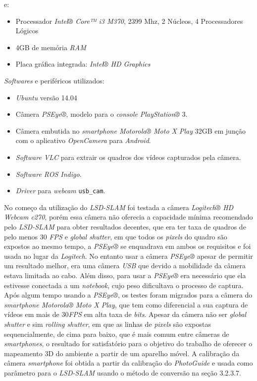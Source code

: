 e:

\begin{itemize}
	\item{Processador \textit{Intel® Core™ i3 M370}, 2399 Mhz, 2 Núcleos, 4 Processadores Lógicos}
	\item{4GB de memória \textit{RAM}}
	\item{Placa gráfica integrada: \textit{Intel® HD Graphics}}
\end{itemize}	

\textit{Softwares} e periféricos utilizados:

\begin{itemize}
	\item{\textit{Ubuntu} versão 14.04\cite{Ubuntu}}
	\item{Câmera \textit{PSEye®}, modelo para o \textit{console} \textit{PlayStation®} 3.}
	\item{Câmera embutida no \textit{smartphone Motorola® Moto X Play} 32GB em junção com o aplicativo \textit{OpenCamera} para \textit{Android}.}
	\item{\textit{Software VLC} para extrair os quadros dos vídeos capturados pela câmera.}
	\item{\textit{Software ROS Indigo}.\cite{ROS-Tutorial}}
	\item{\textit{Driver} para \textit{webcam} \texttt{usb\_cam}.\cite{Setup-USBCAM}}
\end{itemize}

No começo da utilização do \textit{LSD-SLAM} foi testada a câmera \textit{Logitech® HD Webcam c270}, porém essa câmera não oferecia a capacidade mínima recomendado pelo \textit{LSD-SLAM} para obter resultados decentes, que era ter taxa de quadros de pelo menos 30 \textit{FPS} e \textit{global shutter}, em que todos os \textit{pixels} do quadro são expostos ao mesmo tempo, a \textit{PSEye®} se enquadrava em ambos os requisitos e foi usada no lugar da \textit{Logitech}. No entanto usar a câmera \textit{PSEye®} apesar de permitir um resultado melhor, era uma câmera \textit{USB} que devido a mobilidade da câmera estava limitada ao cabo. Além disso, para usar a \textit{PSEye®} era necessário que ela estivesse conectada a um \textit{notebook}, cujo peso dificultava o processo de captura. Após algum tempo usando a \textit{PSEye®}, os testes foram migrados para a câmera do \textit{smartphone Motorola® Moto X Play}, que tem como diferencial a sua captura de vídeos em mais de 30\textit{FPS} em alta taxa de \textit{bits}. Apesar da câmera não ser \textit{global shutter} e sim \textit{rolling shutter}, em que as linhas de \textit{pixels} são expostas sequencialmente, de cima para baixo, que é mais comum entre câmeras de \textit{smartphones}, o resultado for satisfatório para o objetivo do trabalho de oferecer o mapeamento 3D do ambiente a partir de um aparelho móvel. A calibração da câmera \textit{smartphone} foi obtida a partir da calibração do \textit{PhotoGuide} e usada como parâmetro para o \textit{LSD-SLAM} usando o método de conversão na seção 3.2.3.7.

